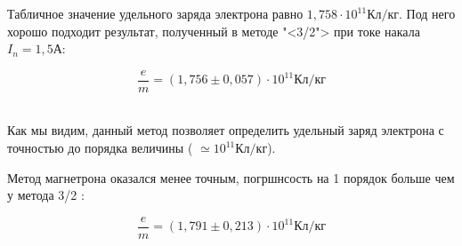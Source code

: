 \documentclass[a4paper,12pt]{article}
\theoremstyle{definition}
\begin{document}
Табличное значение удельного заряда электрона равно $ 1,758 \cdot 10^{11} \text{Кл/кг} $. Под него хорошо подходит результат, полученный в методе "<3/2">  при токе накала $ I_n = 1,5  \text{А}$:


\begin{center}
$$
 \dfrac{e}{m} = (1,756 \pm 0,057) \cdot 10^{11} \text{Кл/кг}
$$
\\
\end{center} 

Как мы видим, данный метод позволяет определить удельный заряд электрона с точностью до порядка величины ( $\simeq  10^{11} \text{Кл/кг}$).

Метод магнетрона оказался менее точным, погршнсость на 1 порядок больше чем у метода 3/2 :
\begin{center}
$$
 \dfrac{e}{m} = (1,791 \pm 0,213) \cdot 10^{11} \text{Кл/кг}
$$
\end{center} 
\end{document}

